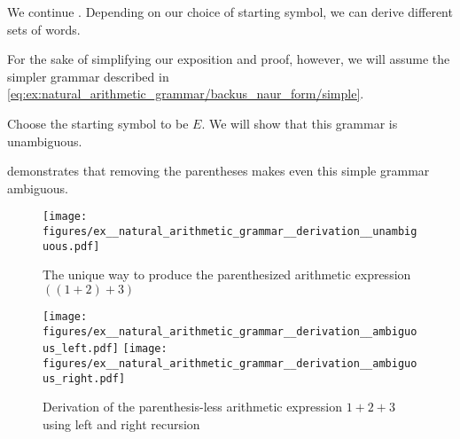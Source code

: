 \begin{example}\label{ex:natural_arithmetic_grammar/derivation}
  We continue . Depending on our choice of starting symbol, we can derive different sets of words.

  For the sake of simplifying our exposition and proof, however, we will assume the simpler grammar described in \eqref{eq:ex:natural_arithmetic_grammar/backus_naur_form/simple}.

  Choose the starting symbol to be \( E \). We will show that this grammar is unambiguous.

   demonstrates that removing the parentheses makes even this simple grammar ambiguous.

  \begin{figure}
    \hfill
    \texttt{[image: figures/ex\_\_natural\_arithmetic\_grammar\_\_derivation\_\_unambiguous.pdf]}
    \hfill\hfill
    \caption{The unique way to produce the parenthesized arithmetic expression \( ((1 + 2) + 3) \)}
    \label{fig:ex:natural_arithmetic_grammar/derivation/unambiguous}
  \end{figure}

  \begin{figure}
    \hfill
    \texttt{[image: figures/ex\_\_natural\_arithmetic\_grammar\_\_derivation\_\_ambiguous\_left.pdf]}
    \hfill
    \texttt{[image: figures/ex\_\_natural\_arithmetic\_grammar\_\_derivation\_\_ambiguous\_right.pdf]}
    \hfill\hfill
    \caption{Derivation of the parenthesis-less arithmetic expression \( 1 + 2 + 3 \) using left and right recursion}
    \label{fig:ex:natural_arithmetic_grammar/derivation/ambiguous}
  \end{figure}
\end{example}

